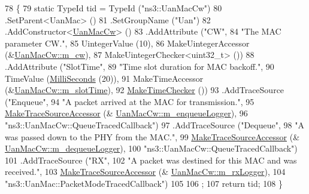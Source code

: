 \begin{DoxyCode}
78 \{
79   \textcolor{keyword}{static} TypeId tid = TypeId (\textcolor{stringliteral}{"ns3::UanMacCw"})
80     .SetParent<UanMac> ()
81     .SetGroupName (\textcolor{stringliteral}{"Uan"})
82     .AddConstructor<\hyperlink{classns3_1_1UanMacCw_a50c713ad2e3ae2459450b06f66efac92}{UanMacCw}> ()
83     .AddAttribute (\textcolor{stringliteral}{"CW"},
84                    \textcolor{stringliteral}{"The MAC parameter CW."},
85                    UintegerValue (10),
86                    MakeUintegerAccessor (&\hyperlink{classns3_1_1UanMacCw_adeaa1556fd593b364a2cba5729d48ab9}{UanMacCw::m\_cw}),
87                    MakeUintegerChecker<uint32\_t> ())
88     .AddAttribute (\textcolor{stringliteral}{"SlotTime"},
89                    \textcolor{stringliteral}{"Time slot duration for MAC backoff."},
90                    TimeValue (\hyperlink{group__timecivil_gaf26127cf4571146b83a92ee18679c7a9}{MilliSeconds} (20)),
91                    MakeTimeAccessor (&\hyperlink{classns3_1_1UanMacCw_a8fa0ad746b687dda61ccfa3f5bab975b}{UanMacCw::m\_slotTime}),
92                    \hyperlink{group__time_ga7032965bd4afa578691d88c09e4481c1}{MakeTimeChecker} ())
93     .AddTraceSource (\textcolor{stringliteral}{"Enqueue"},
94                      \textcolor{stringliteral}{"A packet arrived at the MAC for transmission."},
95                      \hyperlink{group__tracing_gab21a770b9855af4e8f69f7531ea4a6b0}{MakeTraceSourceAccessor} (&
      \hyperlink{classns3_1_1UanMacCw_a16aefbcad66a139dd720b556aa3deb61}{UanMacCw::m\_enqueueLogger}),
96                      \textcolor{stringliteral}{"ns3::UanMacCw::QueueTracedCallback"})
97     .AddTraceSource (\textcolor{stringliteral}{"Dequeue"},
98                      \textcolor{stringliteral}{"A was passed down to the PHY from the MAC."},
99                      \hyperlink{group__tracing_gab21a770b9855af4e8f69f7531ea4a6b0}{MakeTraceSourceAccessor} (&
      \hyperlink{classns3_1_1UanMacCw_ae4e44147f4b565d509706be9cb9b4408}{UanMacCw::m\_dequeueLogger}),
100                      \textcolor{stringliteral}{"ns3::UanMacCw::QueueTracedCallback"})
101     .AddTraceSource (\textcolor{stringliteral}{"RX"},
102                      \textcolor{stringliteral}{"A packet was destined for this MAC and was received."},
103                      \hyperlink{group__tracing_gab21a770b9855af4e8f69f7531ea4a6b0}{MakeTraceSourceAccessor} (&
      \hyperlink{classns3_1_1UanMacCw_a31e115318fa3de0a4172a4b40144e464}{UanMacCw::m\_rxLogger}),
104                      \textcolor{stringliteral}{"ns3::UanMac::PacketModeTracedCallback"})
105 
106   ;
107   \textcolor{keywordflow}{return} tid;
108 \}
\end{DoxyCode}


